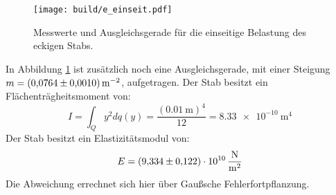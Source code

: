 \begin{figure}[H]
    \centering
    \texttt{[image: build/e\_einseit.pdf]}
    \caption{Messwerte und Ausgleichsgerade für die einseitige Belastung des eckigen Stabs.}
    \label{fig:plot2}
\end{figure}
\noindent In Abbildung \ref{fig:plot2} ist zusätzlich noch eine Ausgleichsgerade, mit einer 
Steigung $m=\SI[per-mode=reciprocal]{0.0764\pm0.001}{\per\meter\squared}$, aufgetragen.
Der Stab besitzt ein Flächenträgheitsmoment von:
\begin{equation*}
  I=\int_Q y^2 dq(y) = \frac{(\SI{0.01}{\meter})^4}{12} = \SI{8.33e-10}{\meter\tothe{4}}
\end{equation*}
Der Stab besitzt ein Elastizitätsmodul von:
\begin{equation*}
  E= \SI{9.334\pm0.122e10}{\newton\per\meter\squared}
\end{equation*}
Die Abweichung errechnet sich hier über Gaußsche Fehlerfortpflanzung.
%
